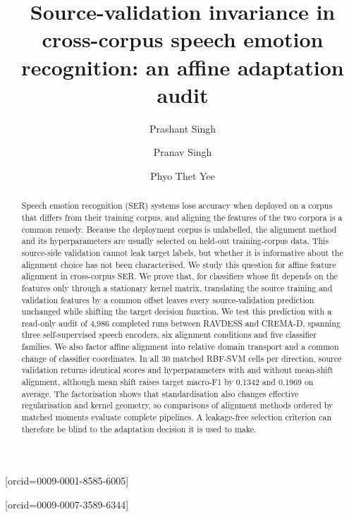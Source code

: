 \documentclass[a4paper,fleqn]{cas-dc}
\begin{document}
\let\WriteBookmarks\relax
\def\floatpagepagefraction{1}
\def\textpagefraction{.001}


\title[mode=title]{Source-validation invariance in cross-corpus speech
  emotion recognition: an affine adaptation audit}

\author[1]{Prashant Singh}[orcid=0009-0001-8585-6005]
\cormark[1]
\fnmark[1]

\author[1]{Pranav Singh}[orcid=0009-0007-3589-6344]
\fnmark[1]

\author[1]{Phyo Thet Yee}



\begin{abstract}
Speech emotion recognition (SER) systems lose accuracy when deployed on a
corpus that differs from their training corpus, and aligning the features of
the two corpora is a common remedy. Because the deployment corpus is
unlabelled, the alignment method and its hyperparameters are usually selected
on held-out training-corpus data. This source-side validation cannot leak
target labels, but whether it is informative about the alignment choice has not
been characterised. We study this question for affine feature alignment in
cross-corpus SER. We prove that, for classifiers whose fit depends on the
features only through a stationary kernel matrix, translating the source
training and validation features by a common offset leaves every
source-validation prediction unchanged while shifting the target decision
function. We test this prediction with a read-only audit of 4,986 completed
runs between RAVDESS and CREMA-D, spanning three self-supervised speech
encoders, six alignment conditions and five classifier families. We also factor
affine alignment into relative domain transport and a common change of
classifier coordinates. In all 30 matched RBF-SVM cells per direction, source
validation returns identical scores and hyperparameters with and without
mean-shift alignment, although mean shift raises target macro-F1 by 0.1342 and
0.1969 on average. The factorisation shows that standardisation also changes
effective regularisation and kernel geometry, so comparisons of alignment
methods ordered by matched moments evaluate complete pipelines. A leakage-free
selection criterion can therefore be blind to the adaptation decision it is
used to make.
\end{abstract}
\end{document}
